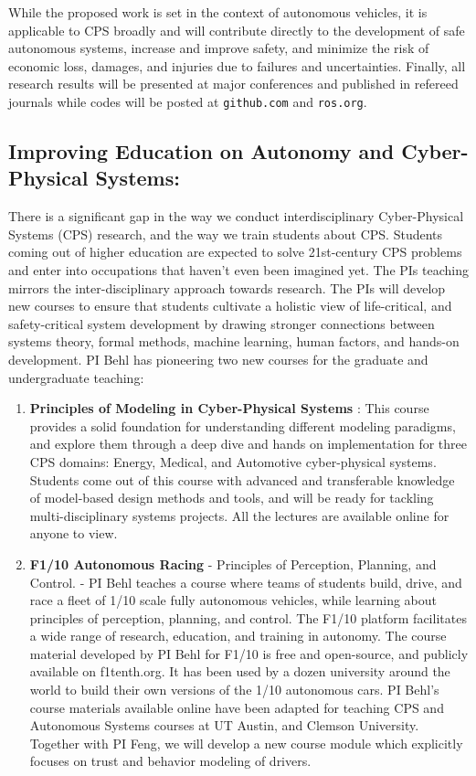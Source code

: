 While the proposed work is set in the context of autonomous vehicles, it is applicable to CPS broadly and will contribute directly to the development of safe autonomous systems, increase and improve safety, and minimize the risk of economic loss, damages, and injuries due to failures and uncertainties. 
Finally, all research results will be presented at major conferences and published in refereed journals while codes will be posted at {\tt{github.com}} and {\tt{ros.org}}.



\subsection{Improving Education on Autonomy and Cyber-Physical Systems:}

There is a significant gap in the way we conduct interdisciplinary Cyber-Physical Systems (CPS) research, and the way we train students about CPS. Students coming out of higher education are expected to solve 21st-century CPS problems and enter into occupations that haven’t even been imagined yet. The PIs teaching mirrors the inter-disciplinary approach towards research. 
The PIs will develop new courses to ensure that students cultivate a holistic view of life-critical, and safety-critical system development by drawing stronger connections between systems theory, formal methods, machine learning, human factors, and hands-on development.
PI Behl has pioneering two new courses for the graduate and undergraduate teaching:
\begin{enumerate}[itemsep=0pt,parsep=0pt,topsep=4pt,leftmargin=0.4in]
    \item \textbf{Principles of Modeling in Cyber-Physical Systems} : This course provides a solid foundation for understanding different modeling paradigms, and explore them through a deep dive and hands on implementation for three CPS domains: Energy, Medical, and Automotive cyber-physical systems. Students come out of this course with advanced and transferable knowledge of model-based design methods and tools, and will be ready for tackling multi-disciplinary systems projects. All the lectures are available online for anyone to view. 
    \item \textbf{F1/10 Autonomous Racing} - Principles of Perception, Planning, and Control. - PI Behl teaches a course where teams of students build, drive, and race a fleet of 1/10 scale fully autonomous vehicles, while learning about principles of perception, planning, and control. The F1/10 platform facilitates a wide range of research, education, and training in autonomy. The course material developed by PI Behl for F1/10 is free and open-source, and publicly available on f1tenth.org. It has been used by a dozen university around the world to build their own versions of the 1/10 autonomous cars. PI Behl's course materials available online have been adapted for teaching CPS and Autonomous Systems courses at UT Austin, and Clemson University. Together with PI Feng, we will develop a new course module which explicitly focuses on trust and behavior modeling of drivers. 
\end{enumerate}

